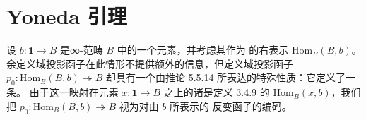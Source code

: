 \providecommand{\qcor}[1]{\ulcorner#1\urcorner}   %
\providecommand{\qcOne}{\mathbf{1}}   %
\providecommand{\hK}{\hbar\mathcal{K}}   %
\providecommand{\hQCat}{\hbar\mathcal{Q}\mathrm{Cat}}   %
\providecommand{\evid}[1]{\mathrm{ev}_{\qcor{\mathrm{id}_{#1}}}}   %

\section{Yoneda 引理}\label{sec:yoneda-lemma}

设 $b\colon\qcOne\to B$ 是∞-范畴 $B$ 中的一个元素，并考虑其作为%
\trCommaInfinityCategory{}的右表示 $\mathrm{Hom}_{B}(B,b)$。
余定义域投影函子在此情形不提供额外的信息，但定义域投影函子
$p_{0}\colon\mathrm{Hom}_{B}(B,b)\twoheadrightarrow B$ 却具有一个由推论 5.5.14
所表达的特殊性质：它定义了一条\trDiscreteCartesianFibration。
由于这一映射在元素 $x\colon\qcOne\to B$ 之上的诸\trFiber{}是定义 3.4.9 的%
\trMappingSpace{} $\mathrm{Hom}_{B}(x,b)$，我们把
$p_{0}\colon\mathrm{Hom}_{B}(B,b)\twoheadrightarrow B$ 视为对由 $b$ 所表示的%
反变函子的编码。

